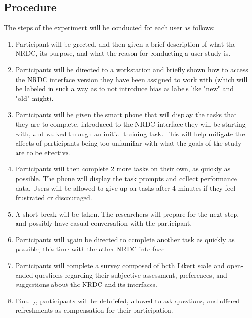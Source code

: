 \documentclass{article}
\begin{document}
\subsection{Procedure}
The steps of the experiment will be conducted for each user as follows:
\begin{enumerate}
\item Participant will be greeted, and then given a brief description of what the NRDC, its purpose, and what the reason for conducting a user study is.

\item Participants will be directed to a workstation and briefly shown how to access the NRDC interface version they have been assigned to work with (which will be labeled in such a way as to not introduce bias as labels like "new" and "old" might).

\item Participants will be given the smart phone that will display the tasks that they are to complete, introduced to the NRDC interface they will be starting with, and walked through an initial training task. This will help mitigate the effects of participants being too unfamiliar with what the goals of the study are to be effective.

\item Participants will then complete 2 more tasks on their own, as quickly as possible. The phone will display the task prompts and collect performance data. Users will be allowed to give up on tasks after 4 minutes if they feel frustrated or discouraged.

\item A short break will be taken. The researchers will prepare for the next step, and possibly have casual conversation with the participant.

\item Participants will again be directed to complete another task as quickly as possible, this time with the other NRDC interface.

\item Participants will complete a survey composed of both Likert scale and open-ended questions regarding their subjective assessment, preferences, and suggestions about the NRDC and its interfaces.

\item Finally, participants will be debriefed, allowed to ask questions, and offered refreshments as compensation for their participation.
%
\end{enumerate}
\end{document}
